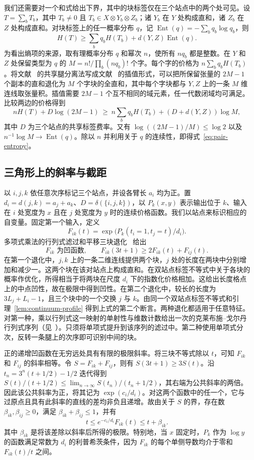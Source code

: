 我们还需要对一个和式给出下界，其中的块标签仅在三个站点中的两个处可见。设 $T=\sum_b T_b$，其中 $T_b\ne0$ 且 $T_b\in X\otimes Y_b\otimes Z_b$；诸 $Y_b$ 在 $Y$ 处构成直和，诸 $Z_b$ 在 $Z$ 处构成直和。对块标签上的任一概率分布 $q$，记 $\operatorname{Ent}(q)=-\sum_b q_b\log q_b$，则
\begin{equation}
 H(T)\ge\sum_b q_b H(T_b)+d(Y,Z)\operatorname{Ent}(q).
 \label{eq:pair-entropy}
\end{equation}
为看出熵项的来源，取有理概率分布 $q$ 和幂次 $n$，使所有 $nq_b$ 都是整数。在 $Y$ 和 $Z$ 处保留类型为 $q$ 的 $M=n!/\prod_b(nq_b)!$ 个字。每个字的价格为 $n\sum_bq_bH(T_b)$。将文献~\cite[命题~3.1]{nine} 的共享腿分离法写成文献~\cite[命题~2.1]{lu} 的插值形式，可以把所保留张量的 $2M-1$ 个副本的直和退化为 $M$ 个字块的全直和，其中每个字块都与 $Y,Z$ 上的一条 $M$ 维连线取张量积。插值需要 $2M-1$ 个互不相同的域元素，任一代数闭域均可满足。比较两边的价格得到
\[
 nH(T)+D\log(2M-1)\ \ge\
 n\sum_bq_bH(T_b)+(D+d(Y,Z))\log M ,
\]
其中 $D$ 为三个站点的共享标签费率。又有 $\log((2M-1)/M)\le\log2$ 以及 $n^{-1}\log M\to\operatorname{Ent}(q)$。除以 $n$ 并利用关于 $q$ 的连续性，即得式~\eqref{eq:pair-entropy}。

\subsection{三角形上的斜率与截距}

以 $i,j,k$ 依任意次序标记三个站点，并设各臂长 $a_i$ 均为正。置 $d_i=d(j,k)=a_j+a_k$、$D=\delta(\{i,j,k\})$，以 $P_k(x,y)$ 表示输出位于 $k$、输入在 $i$ 处宽度为 $x$ 且在 $j$ 处宽度为 $y$ 时的连续价格函数。我们以站点来标识相应的自变量。固定第一个输入，定义
\[
 F_{ik}(t)=\exp\bigl(P_k(t_i=1,t_j=t)/d_i\bigr).
\]
多项式乘法的行列式滤过和平移三块退化~\cite[引理~4.1、4.2~的证明]{nine} 给出
\[
 F_{ik}\text{ 为凹函数},\qquad
 F_{ik}(3t+1)\ge 2F_{ik}(t)+F_{ij}(t).
\]
在第一个退化中，$j,k$ 上的一条二维连线提供两个块，$j$ 处的长度在两块中分别增加和减少一。这两个块在该对站点上构成直和。在双站点标签不等式中关于各块的概率作优化，所得相当于将两块在尺度 $d_i$ 下的指数化价格相加。这给出长度格点上的中点凹性，故在极限中得到凹性。在第二个退化中，较长的长度为 $3L_j+L_i-1$，且三个块中的一个交换 $j$ 与 $k$。由同一个双站点标签不等式和引理~\ref{lem:continuum-profile} 得到上式的第二个断言。两种退化都适用于任意特征。对第一种，乘以行列式这一映射的单射性与维数计数给出一次的克莱布施–戈尔丹行列式序列（见~\cite{kowalski}）。只须将单项式提升到该序列的滤过中。第二种使用单项式分次，反转一条腿上的次序即可识别中间的块。

正的递增凹函数在无穷远处具有有限的极限斜率。将三块不等式除以 $t$，可知 $F_{ik}$ 和 $F_{ij}$ 的斜率相等。令 $S=F_{ik}+F_{ij}$，则有 $S(3t+1)\ge3S(t)$。沿 $t_n=3^n(t+1/2)-1/2$ 迭代得到 $S(t)/(t+1/2)\le \lim_{n\to\infty}S(t_n)/(t_n+1/2)$，其右端为公共斜率的两倍。因此该公共斜率为正，将其记为 $\exp(c_i/d_i)$。对这两个函数中的任一个，它与过原点且具有此斜率的直线的差均非负且递增。故由关于 $S$ 的界，存在数 $\beta_{ik},\beta_{ij}\ge0$，满足 $\beta_{ik}+\beta_{ij}\le1$，并有
\[
 t\le e^{-c_i/d_i}F_{ik}(t)\le t+\beta_{ik}.
\]
其中 $\beta_{ik}$ 是将该差除以斜率后所得的极限。特别地，当 $x$ 固定时，$P_k$ 作为 $\log y$ 的函数满足常数为 $d_i$ 的利普希茨条件，因为 $F_{ik}$ 的每个单侧导数均介于零和 $F_{ik}(t)/t$ 之间。

